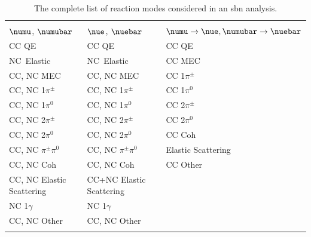 \begin{table}[t!]
  \renewcommand{\arraystretch}{1.6}
  \begin{tabular}{>{\centering\arraybackslash}m{4cm} 
                  >{\centering\arraybackslash}m{4cm}
                  >{\centering\arraybackslash}m{4cm}}
  
    \toprule
    \multicolumn{3}{c}{\textit{Fine Reaction Modes}} \\
    $\numu$, $\numubar$ & $\nue$, $\nuebar$ & $\numu \rightarrow \nue, \numubar \rightarrow \nuebar$ \\
    \midrule
    CC QE                      & CC QE                     & CC QE\\
    NC~Elastic                 & NC~Elastic                & CC MEC\\ 
    CC, NC MEC                 & CC, NC MEC                & CC 1$\pi^{\pm}$ \\  
    CC, NC 1$\pi^{\pm}$        & CC, NC 1$\pi^{\pm}$       & CC 1$\pi^{0}$ \\   
    CC, NC 1$\pi^{0}$          & CC, NC 1$\pi^{0}$         & CC 2$\pi^{\pm}$ \\   
    CC, NC 2$\pi^{\pm}$        & CC, NC 2$\pi^{\pm}$       & CC 2$\pi^{0}$ \\   
    CC, NC 2$\pi^{0}$          & CC, NC 2$\pi^{0}$         & CC Coh \\   
    CC, NC $\pi^{\pm}\pi^{0}$  & CC, NC $\pi^{\pm}\pi^{0}$ & Elastic Scattering \\   
    CC, NC Coh                 & CC, NC Coh                & CC Other \\  
    CC, NC Elastic Scattering  & CC+NC Elastic Scattering  \\  
    NC 1$\gamma$               & NC 1$\gamma$              \\  
    CC, NC Other               & CC, NC Other              \\  
    \hdashline
    \multicolumn{3}{c}{\textit{Cosmic \& Dirt}} \\
    \bottomrule

  \end{tabular}
  \caption[Fine Reaction Modes.]{The complete list of reaction modes considered in an \gls{sbn} analysis.}
  \label{table:fine_reac_modes}
\end{table}


